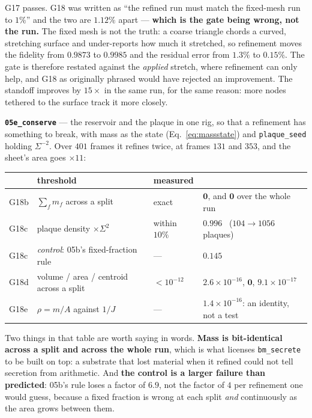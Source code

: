 \documentclass[10pt,a4paper]{article}
\newcommand{\op}[1]{\texttt{#1}}
\begin{document}
G17 passes. G18 was written as ``the refined run must match the fixed-mesh run to $1\%$'' and the two
are $1.12\%$ apart --- \textbf{which is the gate being wrong, not the run.} The fixed mesh is not the
truth: a coarse triangle chords a curved, stretching surface and under-reports how much it stretched, so
refinement moves the fidelity from $0.9873$ to $0.9985$ and the residual error from $1.3\%$ to $0.15\%$.
The gate is therefore restated against the \emph{applied} stretch, where refinement can only help, and
G18 as originally phrased would have rejected an improvement. The standoff improves by $15\times$ in the
same run, for the same reason: more nodes tethered to the surface track it more closely.

\textbf{\op{05e\_conserve}} --- the reservoir and the plaque in one rig, so that a refinement has
something to break, with mass as the state (Eq.~\ref{eq:massstate}) and \op{plaque\_seed} holding
$\Sigma^{-2}$. Over $401$ frames it refines twice, at frames $131$ and $353$, and the sheet's area goes
$\times11$:

\smallskip
{\small\begin{tabular}{@{}llll@{}}\toprule
& threshold & measured & \\\midrule
G18b & $\sum_f m_f$ across a split & exact & $\mathbf{0}$, and $\mathbf{0}$ over the whole run\\
G18c & plaque density $\times\Sigma^{2}$ & within $10\%$ & $\mathbf{0.996}$ \ ($104\to1056$ plaques)\\
G18c & \emph{control}: 05b's fixed-fraction rule & --- & $0.145$\\
G18d & volume / area / centroid across a split & $<10^{-12}$ &
  $2.6\times10^{-16}$, $\mathbf 0$, $9.1\times10^{-17}$\\
G18e & $\rho=m/A$ against $1/J$ & --- & $1.4\times10^{-16}$: an identity, not a test\\
\bottomrule\end{tabular}}
\smallskip

Two things in that table are worth saying in words. \textbf{Mass is bit-identical across a split and
across the whole run}, which is what licenses \op{bm\_secrete} to be built on top: a substrate that lost
material when it refined could not tell secretion from arithmetic. And \textbf{the control is a larger
failure than predicted}: 05b's rule loses a factor of $6.9$, not the factor of $4$ per refinement one
would guess, because a fixed fraction is wrong at each split \emph{and} continuously as the area grows
between them.
\end{document}
